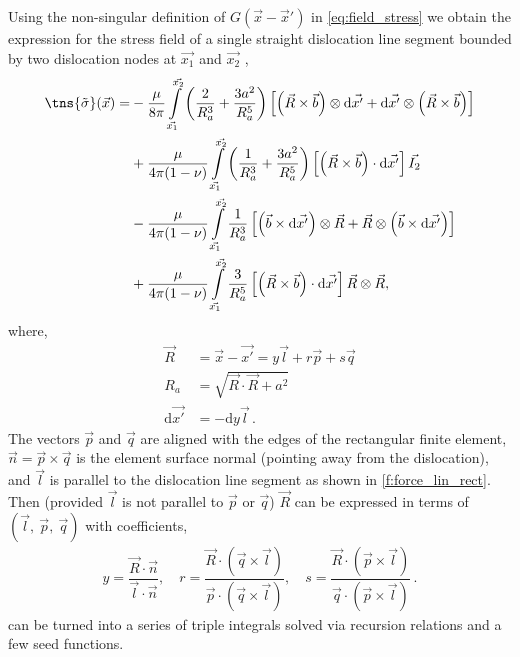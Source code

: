 Using the non-singular definition of $ G(\vec{x}-\vec{x}') $ in \cref{eq:field_stress} we obtain the expression for the stress field of a single straight dislocation line segment bounded by two dislocation nodes at $\vec{x_1}$ and $\vec{x_2}$ \cite{a_non-singular_continuum_theory_of_dislocations},
\begin{align}
    \label{eq:stressIntro}
    \tns{\tilde{\sigma}}(\vec{x}) = &
    - \dfrac{\mu}{8\pi} \int\limits_{\vec{x_1}}^{\vec{x_2}} \left( \dfrac{2}{R_{a}^{3}} + \dfrac{3a^2}{R_{a}^{5}} \right) \left[ \left(\vec{R} \times \vec{b}\right) \otimes \mathrm{d}\vec{x'} + \mathrm{d}\vec{x'} \otimes \left(\vec{R} \times \vec{b}\right) \right]          \\
                                    & + \dfrac{\mu}{4\pi(1-\nu)} \int\limits_{\vec{x_1}}^{\vec{x_2}} \left( \dfrac{1}{R_{a}^{3}} + \dfrac{3a^2}{R_{a}^{5}} \right) \left[ \left(\vec{R} \times \vec{b}\right) \cdot \mathrm{d}\vec{x'} \right]\vec{I_2}\nonumber                  \\
                                    & -\dfrac{\mu}{4\pi(1-\nu)} \int\limits_{\vec{x_1}}^{\vec{x_2}}  \dfrac{1}{R_{a}^{3}} \left[ \left(\vec{b} \times \mathrm{d}\vec{x'}\right) \otimes \vec{R} + \vec{R} \otimes \left(\vec{b} \times \mathrm{d}\vec{x'}\right) \right]\nonumber \\
                                    & + \dfrac{\mu}{4\pi(1-\nu)} \int\limits_{\vec{x_1}}^{\vec{x_2}} \dfrac{3}{R_{a}^{5}} \left[ \left(\vec{R} \times \vec{b}\right) \cdot \mathrm{d}\vec{x'} \right]\vec{R}\otimes\vec{R}\nonumber,
\end{align}
where,
\begin{align}
    \vec{R}            & = \vec{x} - \vec{x'} = y \vec{l} + r \vec{p} + s \vec{q} \\
    R_a                & = \sqrt{\vec{R} \cdot \vec{R} + a^2}                     \\
    \mathrm{d}\vec{x'} & = -\mathrm{d} y \vec{l}\,.
\end{align}
The vectors $\vec{p}$ and $\vec{q}$ are aligned with the edges of the rectangular finite element, $\vec{n} = \vec{p} \times \vec{q}$ is the element surface normal (pointing away from the dislocation), and $\vec{l}$ is parallel to the dislocation line segment as shown in \cref{f:force_lin_rect}. Then (provided $\vec{l}$ is not parallel to $\vec{p}$ or $\vec{q}$) $\vec{R}$ can be expressed in terms of $(\vec{l},~\vec{p},~\vec{q})$ with coefficients,
\begin{align}
    y = \dfrac{\vec{R}\cdot \vec{n}}{\vec{l}\cdot \vec{n}} \label{eq:problemIntro},\quad
    r = \dfrac{\vec{R}\cdot (\vec{q} \times \vec{l})}{\vec{p}\cdot (\vec{q} \times \vec{l})}, \quad
    s = \dfrac{\vec{R}\cdot (\vec{p} \times \vec{l})}{\vec{q}\cdot (\vec{p} \times \vec{l})}\,.
\end{align}
 can be turned into a series of triple integrals solved via recursion relations and a few seed functions.

